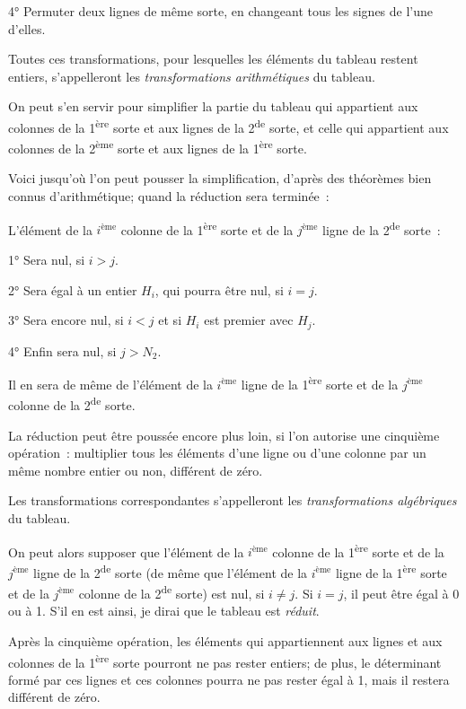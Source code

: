 \documentclass{article}
\begin{document}

4° Permuter deux lignes de même sorte, en changeant tous les signes de l'une d'elles.

Toutes ces transformations, pour lesquelles les éléments du tableau restent entiers, s'appelleront les \emph{transformations arithmétiques} du tableau.

On peut s'en servir pour simplifier la partie du tableau qui appartient aux colonnes de la 1\textsuperscript{ère} sorte et aux lignes de la 2\textsuperscript{de} sorte, et celle qui appartient aux colonnes de la 2\textsuperscript{ème} sorte et aux lignes de la 1\textsuperscript{ère} sorte.

Voici jusqu'où l'on peut pousser la simplification, d'après des théorèmes bien connus d'arithmétique; quand la réduction sera terminée~:

L'élément de la $i^{\text{ème}}$ colonne de la 1\textsuperscript{ère} sorte et de la $j^{\text{ème}}$ ligne de la 2\textsuperscript{de} sorte~:

1° Sera nul, si $i > j$.

2° Sera égal à un entier $H_{i}$, qui pourra être nul, si $i = j$.

3° Sera encore nul, si $i < j$ et si $H_{i}$ est premier avec $H_{j}$.

4° Enfin sera nul, si $j > N_{2}$.

Il en sera de même de l'élément de la $i^{\text{ème}}$ ligne de la 1\textsuperscript{ère} sorte et de la $j^{\text{ème}}$ colonne de la 2\textsuperscript{de} sorte.

La réduction peut être poussée encore plus loin, si l'on autorise une cinquième opération~: multiplier tous les éléments d'une ligne ou d'une colonne par un même nombre entier ou non, différent de zéro.

Les transformations correspondantes s'appelleront les \emph{transformations algébriques} du tableau.

On peut alors supposer que l'élément de la $i^{\text{ème}}$ colonne de la 1\textsuperscript{ère} sorte et de la $j^{\text{ème}}$ ligne de la 2\textsuperscript{de} sorte (de même que l'élément de la $i^{\text{ème}}$ ligne de la 1\textsuperscript{ère} sorte et de la $j^{\text{ème}}$ colonne de la 2\textsuperscript{de} sorte) est nul, si $i \neq j$. Si $i = j$, il peut être égal à 0 ou à 1. S'il en est ainsi, je dirai que le tableau est \emph{réduit}.

Après la cinquième opération, les éléments qui appartiennent aux lignes et aux colonnes de la 1\textsuperscript{ère} sorte pourront ne pas rester entiers; de plus, le déterminant formé par ces lignes et ces colonnes pourra ne pas rester égal à 1, mais il restera différent de zéro.
\end{document}
